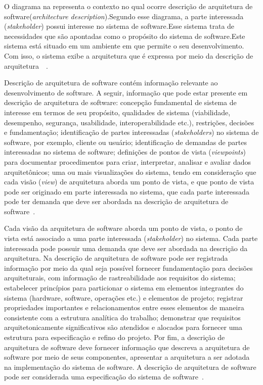 %

O diagrama na  representa o contexto no qual ocorre descrição de arquitetura de software(\emph{architecture description}).Segundo esse diagrama, a parte interessada (\emph{stakeholder}) possui interesse no sistema de software.Esse sistema trata de necessidades que são apontadas como o propósito do sistema de software.Este sistema está situado em um ambiente em que permite o seu desenvolvimento. Com isso, o sistema exibe a arquitetura que é expressa por meio da descrição de arquitetura~\cite{ISO_1471}~\cite{ISO_42010}. 

Descrição de arquitetura de software contém informação relevante ao desenvolvimento de software. A seguir, informação que pode estar presente em descrição de arquitetura de software: concepção fundamental de sistema de interesse em termos de seu propósito, qualidades de sistema (viabilidade, desempenho, segurança, usabilidade, interoperabilidade etc.), restrições, decisões e fundamentação; identificação de partes interessadas (\emph{stakeholders}) no sistema de software, por exemplo, cliente ou usuário; identificação de demandas de partes interessadas no sistema de software; definições de pontos de vista (\emph{viewpoints}) para documentar procedimentos para criar, interpretar, analisar e avaliar dados arquitetônicos; uma ou mais visualizações do sistema, tendo em consideração que cada visão (\emph{view}) de arquitetura aborda um ponto de vista, e que ponto de vista pode ser originado em parte interessada no sistema, que cada parte interessada pode ter demanda que deve ser abordada na descrição de arquitetura de software~\cite{ISO_15289}. 

Cada visão da arquitetura de software aborda um ponto de vista, o ponto de vista está associado a uma parte interessada (\emph{stakeholder}) no sistema. Cada parte interessada pode possuir uma demanda que deve ser abordada na descrição da arquitetura. Na descrição de arquitetura de software pode ser registrada informação por meio da qual seja possível fornecer fundamentação para decisões arquiteturais, com informação de rastreabilidade aos requisitos do sistema; estabelecer princípios para particionar o sistema em elementos integrantes do sistema (hardware, software, operações etc.) e elementos de projeto; registrar propriedades importantes e relacionamentos entre esses elementos de maneira consistente com a estrutura analítica do trabalho; demonstrar que requisitos arquitetonicamente significativos são atendidos e alocados para fornecer uma estrutura para especificação e refino do projeto. Por fim, a descrição de arquitetura de software deve fornecer informação que descreva a arquitetura de software por meio de seus componentes, apresentar a arquitetura a ser adotada na implementação do sistema de software. A descrição de arquitetura de software pode ser considerada uma especificação do sistema de software~\cite{ISO_15289}. 

